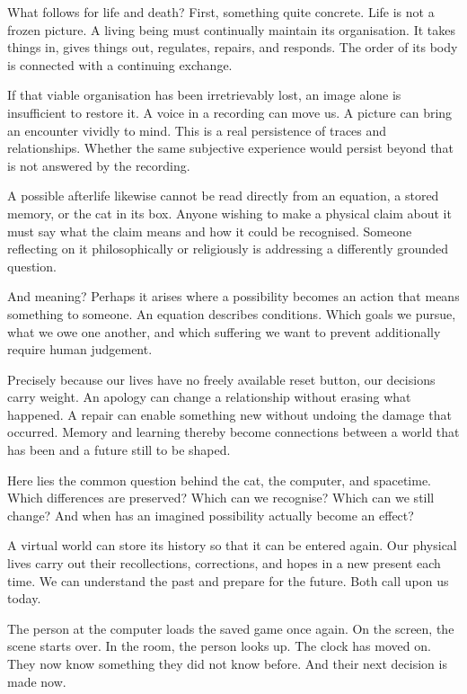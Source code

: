 What follows for life and death? First, something quite concrete. Life is not a frozen picture. A living being must continually maintain its organisation. It takes things in, gives things out, regulates, repairs, and responds. The order of its body is connected with a continuing exchange.

If that viable organisation has been irretrievably lost, an image alone is insufficient to restore it. A voice in a recording can move us. A picture can bring an encounter vividly to mind. This is a real persistence of traces and relationships. Whether the same subjective experience would persist beyond that is not answered by the recording.

A possible afterlife likewise cannot be read directly from an equation, a stored memory, or the cat in its box. Anyone wishing to make a physical claim about it must say what the claim means and how it could be recognised. Someone reflecting on it philosophically or religiously is addressing a differently grounded question.

And meaning? Perhaps it arises where a possibility becomes an action that means something to someone. An equation describes conditions. Which goals we pursue, what we owe one another, and which suffering we want to prevent additionally require human judgement.

Precisely because our lives have no freely available reset button, our decisions carry weight. An apology can change a relationship without erasing what happened. A repair can enable something new without undoing the damage that occurred. Memory and learning thereby become connections between a world that has been and a future still to be shaped.

Here lies the common question behind the cat, the computer, and spacetime. Which differences are preserved? Which can we recognise? Which can we still change? And when has an imagined possibility actually become an effect?

A virtual world can store its history so that it can be entered again. Our physical lives carry out their recollections, corrections, and hopes in a new present each time. We can understand the past and prepare for the future. Both call upon us today.

The person at the computer loads the saved game once again. On the screen, the scene starts over. In the room, the person looks up. The clock has moved on. They now know something they did not know before. And their next decision is made now.

